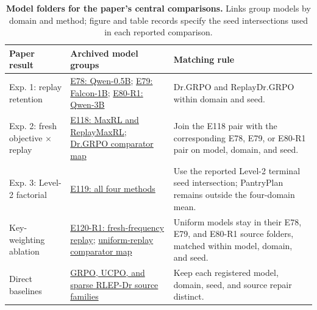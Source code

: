 \documentclass{article}
\newcommand{\1}{\mathbf 1}
\theoremstyle{remark}
\theoremstyle{definition}
\theoremstyle{plain}
\begin{document}
\begin{table}[H]
  \centering
  \caption{\textbf{Model folders for the paper's central comparisons.}
  Links group models by domain and method; figure and table records specify
  the seed intersections used in each reported comparison.}
  \label{tab:archive-model-map}
  \small
  \setlength{\tabcolsep}{4pt}
  \begin{tabularx}{\linewidth}{@{}P{.24\linewidth}YP{.37\linewidth}@{}}
    \toprule
    \textbf{Paper result} & \textbf{Archived model groups} & \textbf{Matching rule} \\
    \midrule
    Exp. 1: replay retention &
      \href{https://huggingface.co/od2961/maxent-grpo-models/blob/main/experiments/E78/README.md}{E78: Qwen-0.5B};
      \href{https://huggingface.co/od2961/maxent-grpo-models/blob/main/experiments/E79/README.md}{E79: Falcon-1B};
      \href{https://huggingface.co/od2961/maxent-grpo-models/blob/main/experiments/E80-R1/README.md}{E80-R1: Qwen-3B} &
      Dr.GRPO and ReplayDr.GRPO within domain and seed. \\
    Exp. 2: fresh objective $\times$ replay &
      \href{https://huggingface.co/od2961/maxent-grpo-models/blob/main/experiments/E118/README.md}{E118: MaxRL and ReplayMaxRL};
      \href{https://huggingface.co/od2961/maxent-grpo-models/blob/main/experiments/E118/README.md\#comparators}{Dr.GRPO comparator map} &
      Join the E118 pair with the corresponding E78, E79, or E80-R1 pair on model, domain, and seed. \\
    Exp. 3: Level-2 factorial &
      \href{https://huggingface.co/od2961/maxent-grpo-models/blob/main/experiments/E119/README.md}{E119: all four methods} &
      Use the reported Level-2 terminal seed intersection; PantryPlan remains outside the four-domain mean. \\
    Key-weighting ablation &
      \href{https://huggingface.co/od2961/maxent-grpo-models/blob/main/experiments/E120-R1/README.md}{E120-R1: fresh-frequency replay};
      \href{https://huggingface.co/od2961/maxent-grpo-models/blob/main/experiments/E120-R1/README.md\#comparators}{uniform-replay comparator map} &
      Uniform models stay in their E78, E79, and E80-R1 source folders, matched within model, domain, and seed. \\
    Direct baselines &
      \href{https://huggingface.co/od2961/maxent-grpo-models/blob/main/EXPERIMENTS.md\#direct-comparators}{GRPO, UCPO, and sparse RLEP-Dr source families} &
      Keep each registered model, domain, seed, and source repair distinct. \\

\end{tabularx}
\end{table}
\end{document}
